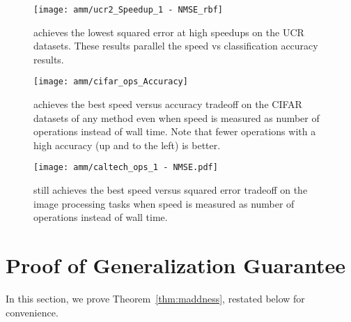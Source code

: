 \begin{figure}[h]
\begin{center}
\texttt{[image: amm/ucr2\_Speedup\_1 - NMSE\_rbf]}
\caption{\oursp achieves the lowest squared error at high speedups on the UCR datasets. These results parallel the speed vs classification accuracy results.}
\label{fig:ucrNMSE}
\end{center}
\end{figure}

\begin{figure}[h]
\begin{center}
\texttt{[image: amm/cifar\_ops\_Accuracy]}
\caption{\oursp achieves the best speed versus accuracy tradeoff on the CIFAR datasets of any method even when speed is measured as number of operations instead of wall time. Note that fewer operations with a high accuracy (up and to the left) is better.}
\label{fig:cifarOps}
\end{center}
\end{figure}

\begin{figure}[h]
\begin{center}
\texttt{[image: amm/caltech\_ops\_1 - NMSE.pdf]}
\caption{\oursp still achieves the best speed versus squared error tradeoff on the image processing tasks when speed is measured as number of operations instead of wall time.}
\label{fig:caltechOps}
\end{center}
\end{figure}


\clearpage
\section{Proof of Generalization Guarantee} \label{sec:maddnessMath}

In this section, we prove Theorem~\ref{thm:maddness}, restated below for convenience.

